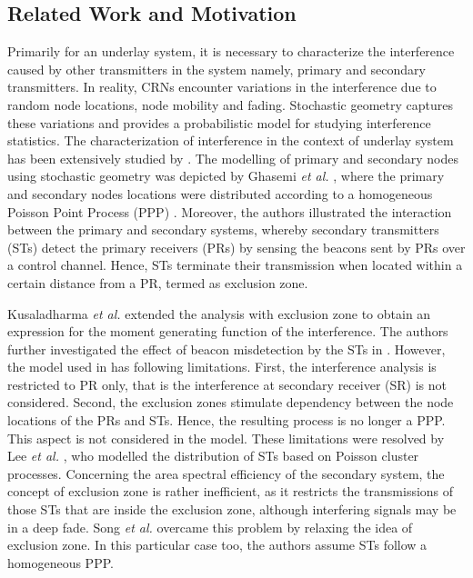 \documentclass[conference, twocolumn]{IEEEtran}
\begin{document}
\subsection{Related Work and Motivation}
Primarily for an underlay system, it is necessary to characterize the interference caused by other transmitters in the system namely, primary and secondary transmitters. In reality, CRNs encounter variations in the interference due to random node locations, node mobility and fading. Stochastic geometry captures these variations and provides a probabilistic model for studying interference statistics. The characterization of interference in the context of underlay system has been extensively studied by \cite{Ghasemi08, Kusal12, Kusal13, Lee12, Guo13, Song14}. The modelling of primary and secondary nodes using stochastic geometry was depicted by Ghasemi \textit{et al.} \cite{Ghasemi08}, where the primary and secondary nodes locations were distributed according to a homogeneous Poisson Point Process (PPP) \cite{Haenggi}. Moreover, the authors illustrated the interaction between the primary and secondary systems, whereby secondary transmitters (STs) detect the primary receivers (PRs) by sensing the beacons sent by PRs over a control channel. %
Hence, STs terminate their transmission when located within a certain distance from a PR, termed as exclusion zone. 

Kusaladharma \textit{et al.} \cite{Kusal12} extended the analysis with exclusion zone to obtain an expression for the moment generating function of the interference. The authors further investigated the effect of beacon misdetection by the STs in \cite{Kusal13}. However, the model used in \cite{Kusal12, Kusal13} has following limitations. First, the interference analysis is restricted to PR only, that is the interference at secondary receiver (SR) is not considered. Second, the exclusion zones stimulate dependency between the node locations of the PRs and STs. Hence, the resulting process is no longer a PPP. This aspect is not considered in the model. 
These limitations were resolved by Lee \textit{et al.} \cite{Lee12}, who modelled the distribution of STs based on Poisson cluster processes. %
Concerning the area spectral efficiency of the secondary system, the concept of exclusion zone is rather inefficient, as it restricts the transmissions of those STs that are inside the exclusion zone, although interfering signals may be in a deep fade. Song \textit{et al.} \cite{Song14} overcame this problem by relaxing the idea of exclusion zone. %
In this particular case too, the authors assume STs follow a homogeneous PPP. %
 
\end{document}
